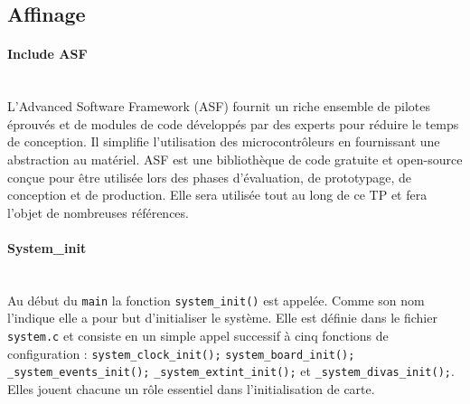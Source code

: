 \documentclass[a4paper]{article}
\begin{document}
	\subsection{Affinage}
	
	\paragraph{Include ASF}
	~~\\
	L'Advanced Software Framework (ASF) fournit un riche ensemble de pilotes éprouvés et de modules de code développés par des experts pour réduire le temps de conception. Il simplifie l'utilisation des microcontrôleurs en fournissant une abstraction au matériel. ASF est une bibliothèque de code gratuite et open-source conçue pour être utilisée lors des phases d'évaluation, de prototypage, de conception et de production. Elle sera utilisée tout au long de ce TP et fera l'objet de nombreuses références.
	
	\paragraph{System\_init}
	~~\\
	Au début du \texttt{main} la fonction \texttt{system\_init()} est appelée. Comme son nom l'indique elle a pour but d'initialiser le système. Elle est définie dans le fichier \texttt{system.c} et consiste en un simple appel successif à cinq fonctions de configuration : 	 
	\texttt{system\_clock\_init();}
	\texttt{system\_board\_init();}
	\texttt{\_system\_events\_init();}
	\texttt{\_system\_extint\_init();}
	et  \texttt{\_system\_divas\_init();}.
	Elles jouent chacune un rôle essentiel dans l'initialisation de carte.
	
\end{document}
